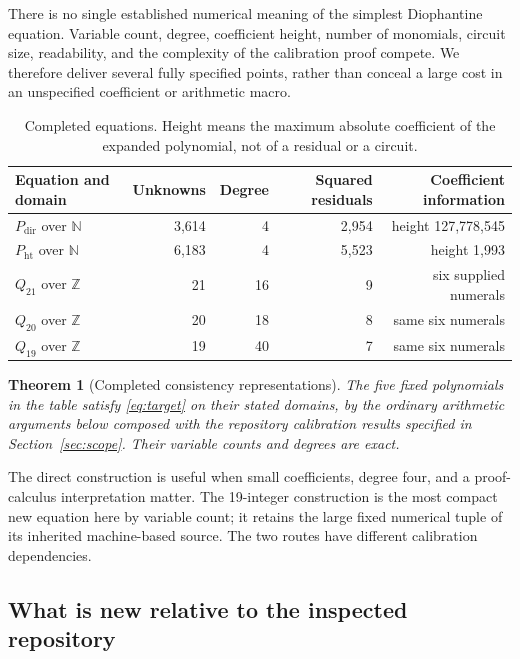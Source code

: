 \documentclass[11pt,letterpaper]{article}
\newtheorem{theorem}{Theorem}[section]
\newcommand{\N}{\mathbb N}
\newcommand{\Z}{\mathbb Z}
\begin{document}
There is no single established numerical meaning of the simplest
Diophantine equation. Variable count, degree, coefficient height, number
of monomials, circuit size, readability, and the complexity of the
calibration proof compete. We therefore deliver several fully specified
points, rather than conceal a large cost in an unspecified coefficient
or arithmetic macro.

\begin{table}[h]
\centering\small
\begin{tabular}{lrrrr}
\toprule
Equation and domain & Unknowns & Degree & Squared residuals & Coefficient information\\
\midrule
$P_{\mathrm{dir}}$ over $\N$ & 3,614 & 4 & 2,954 & height 127,778,545\\
$P_{\mathrm{ht}}$ over $\N$ & 6,183 & 4 & 5,523 & height 1,993\\
$Q_{21}$ over $\Z$ & 21 & 16 & 9 & six supplied numerals\\
$Q_{20}$ over $\Z$ & 20 & 18 & 8 & same six numerals\\
$Q_{19}$ over $\Z$ & 19 & 40 & 7 & same six numerals\\
\bottomrule
\end{tabular}
\caption{Completed equations. Height means the maximum absolute coefficient
of the expanded polynomial, not of a residual or a circuit.}
\end{table}

\begin{theorem}[Completed consistency representations]\label{thm:main}
The five fixed polynomials in the table satisfy \eqref{eq:target} on
their stated domains, by the ordinary arithmetic arguments below composed
with the repository calibration results specified in
Section~\ref{sec:scope}. Their variable counts and degrees are exact.
\end{theorem}

The direct construction is useful when small coefficients, degree four,
and a proof-calculus interpretation matter. The 19-integer construction
is the most compact new equation here by variable count; it retains the
large fixed numerical tuple of its inherited machine-based source.
The two routes have different calibration dependencies.

\subsection{What is new relative to the inspected repository}
\end{document}
